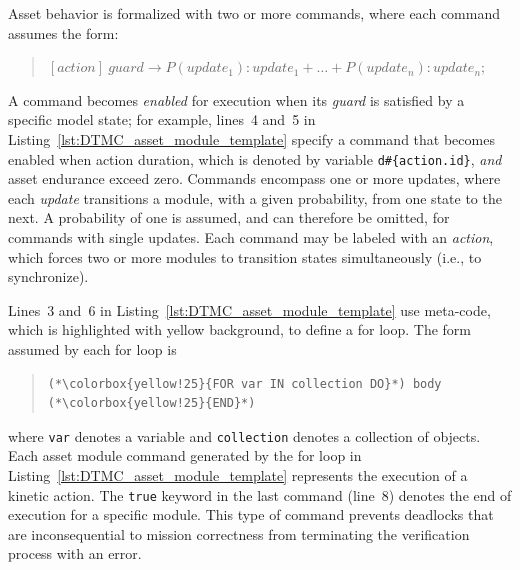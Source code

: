 Asset behavior is formalized with two or more commands, where each command assumes the form:

\begin{quote}
$[action]\:guard \rightarrow P(update_1) : update_1 + \ldots + P(update_n) : update_n;$
\end{quote}

\noindent A command becomes \emph{enabled} for execution when its \emph{guard} is satisfied by a specific model state; for example, lines~4 and~5 in Listing~\ref{lst:DTMC_asset_module_template} specify a command that becomes enabled when action duration, which is denoted by variable \texttt{d\#\{action.id\}}, \emph{and} asset endurance exceed zero. Commands encompass one or more updates, where each \emph{update} transitions a module, with a given probability, from one state to the next. A probability of one is assumed, and can therefore be omitted, for commands with single updates. Each command may be labeled with an \emph{action}, which forces two or more modules to transition states simultaneously (i.e., to synchronize).

Lines~3 and~6 in Listing~\ref{lst:DTMC_asset_module_template} use meta-code, which is highlighted with yellow background, to define a for loop. The form assumed by each for loop is

\begin{quote}
\begin{lstlisting}[frame=none,numbers=none]
(*\colorbox{yellow!25}{FOR var IN collection DO}*) body (*\colorbox{yellow!25}{END}*)
\end{lstlisting}
\end{quote}

\noindent where \texttt{var} denotes a variable and \texttt{collection} denotes a collection of objects. Each asset module command generated by the for loop in Listing~\ref{lst:DTMC_asset_module_template} represents the execution of a kinetic action. The \texttt{true} keyword in the last command (line~8) denotes the end of execution for a specific module. This type of command prevents deadlocks that are inconsequential to mission correctness from terminating the verification process with an error.

